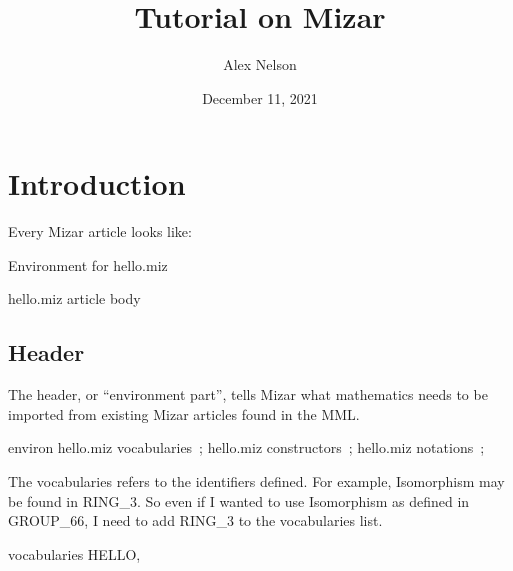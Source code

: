 \documentclass[oneside]{book}%
\title{Tutorial on Mizar}
\author{Alex Nelson}
\date{December 11, 2021}
\begin{document}
\chapter{Introduction}

\M
Every Mizar article looks like:

\endmoddef\nwstartdeflinemarkup\nwenddeflinemarkup

\LA{}Environment for \code{}hello.miz\edoc{}~{\nwtagstyle{}}\RA{}

\LA{}\code{}hello.miz\edoc{} article body~{\nwtagstyle{}}\RA{}
\nwendcode{}\nwdocspar



\section{Header}

\M
The header, or ``environment part'', tells Mizar what mathematics needs
to be imported from existing Mizar articles found in the MML.

\nwenddocs{}\endmoddef\nwstartdeflinemarkup{}\nwenddeflinemarkup
environ
 \LA{}\code{}hello.miz\edoc{} vocabularies~{\nwtagstyle{}}\RA{};
 \LA{}\code{}hello.miz\edoc{} constructors~{\nwtagstyle{}}\RA{};
 \LA{}\code{}hello.miz\edoc{} notations~{\nwtagstyle{}}\RA{};
\nwendcode{}\nwdocspar

The {\Tt{}vocabularies\nwendquote} refers to the identifiers defined. For example,
{\Tt{}Isomorphism\nwendquote} may be found in {\Tt{}RING{\_}3\nwendquote}. So even if I wanted to use
{\Tt{}Isomorphism\nwendquote} as defined in {\Tt{}GROUP{\_}66\nwendquote}, I need to add {\Tt{}RING{\_}3\nwendquote} to
the vocabularies list.

\nwenddocs{}\endmoddef\nwstartdeflinemarkup{}\nwenddeflinemarkup
vocabularies HELLO,
\nwendcode{}\nwdocspar
\end{document}
